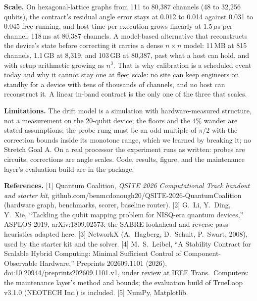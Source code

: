 \documentclass[10pt,letterpaper]{article}
\begin{document}
\textbf{Scale.} On hexagonal-lattice graphs from 111 to 80,387 channels (48 to 32,256 qubits), the contract's residual angle error stays at 0.012 to 0.014 against 0.031 to 0.045 free-running, and host time per execution grows linearly at 1.5\,$\mu$s per channel, 118\,ms at 80,387 channels. A model-based alternative that reconstructs the device's state before correcting it carries a dense $n{\times}n$ model: 11\,MB at 815 channels, 1.1\,GB at 8,319, and 103\,GB at 80,387, past what a host can hold, and with setup arithmetic growing as $n^3$. That is why calibration is a scheduled event today and why it cannot stay one at fleet scale: no site can keep engineers on standby for a device with tens of thousands of channels, and no host can reconstruct it. A linear in-band contract is the only one of the three that scales.

\textbf{Limitations.}
The drift model is a simulation with hardware-measured structure, not a measurement on the 20-qubit device; the floors and the 4\% wander are stated assumptions; the probe rung must be an odd multiple of $\pi/2$ with the correction bounds inside its monotone range, which we learned by breaking it; no Stretch Goal A. On a real processor the experiment runs as written: probes are circuits, corrections are angle scales. Code, results, figure, and the maintenance layer's evaluation build are in the package.

\vspace{2pt}\scriptsize\textbf{References.} [1] Quantum Coalition, \emph{QSITE 2026 Computational Track handout and starter kit}, github.com/benmcdonough20/QSITE-2026-QuantumCoalition (hardware graph, benchmarks, scorer, baseline router). [2] G.~Li, Y.~Ding, Y.~Xie, ``Tackling the qubit mapping problem for NISQ-era quantum devices,'' ASPLOS 2019, arXiv:1809.02573: the SABRE lookahead and reverse-pass heuristics adapted here. [3] NetworkX (A.~Hagberg, D.~Schult, P.~Swart, 2008), used by the starter kit and the solver. [4] M.~S.~Leibel, ``A Stability Contract for Scalable Hybrid Computing: Minimal Sufficient Control of Component-Observable Hardware,'' Preprints 202609.1101 (2026), doi:10.20944/preprints202609.1101.v1, under review at IEEE Trans.\ Computers: the maintenance layer's method and bounds; the evaluation build of TrueLoop v3.1.0 (NEOTECH Inc.) is included. [5] NumPy, Matplotlib.
\end{document}
